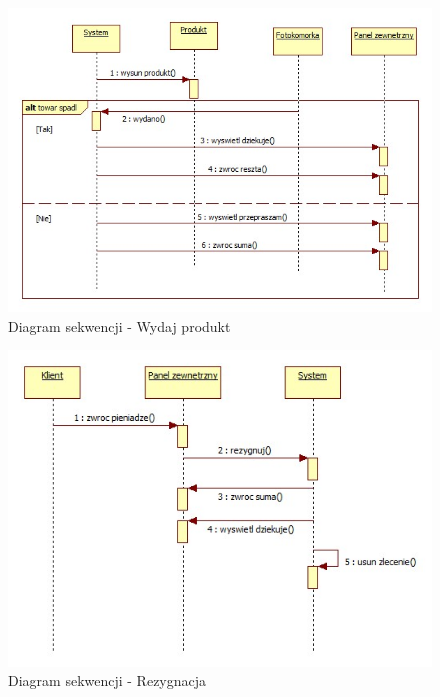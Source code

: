 \documentclass[a4paper, 11pt]{article}
\begin{document}
\begin{figure}[H]
\centerline{\includegraphics[scale=0.8]{../Diagrams/wydajProdukt}}
\caption{Diagram sekwencji - Wydaj produkt}
\end{figure}

\begin{figure}[H]
\centerline{\includegraphics[scale=0.9]{../Diagrams/rezygnacja}}
\caption{Diagram sekwencji - Rezygnacja}
\end{figure}
\end{document}
